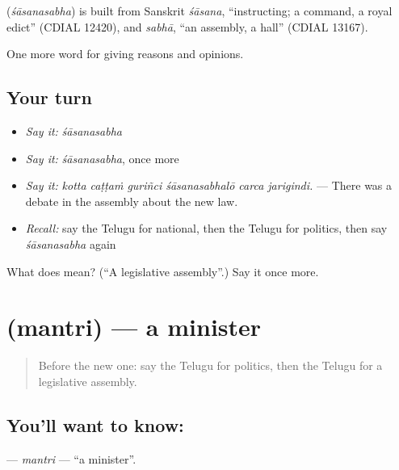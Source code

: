 \begin{cousinweb}
\textbf{} (\emph{śāsanasabha}) is built from Sanskrit \emph{śāsana}, \textquotedblleft{}instructing; a command, a royal edict\textquotedblright{} (CDIAL 12420), and \emph{sabhā}, \textquotedblleft{}an assembly, a hall\textquotedblright{} (CDIAL 13167).
\end{cousinweb}

\begin{grammarlens}[title={What you've built}]
One more word for giving reasons and opinions.
\end{grammarlens}

\subsection*{Your turn}
\begin{itemize}
\raggedright
  \item \emph{Say it:} \emph{śāsanasabha}
  \item \emph{Say it:} \emph{śāsanasabha}, once more
  \item \emph{Say it:} \emph{kotta caṭṭaṁ guriñci śāsanasabhalō carca jarigindi.} — There was a debate in the assembly about the new law.
  \item \emph{Recall:} say the Telugu for national, then the Telugu for politics, then say \emph{śāsanasabha} again
\end{itemize}

\begin{tcolorbox}[breakable,colback=teal!4,colframe=teal!35!black,title={Before you move on}]
What does  mean? (\textquotedblleft{}A legislative assembly\textquotedblright{}.) Say it once more.
\end{tcolorbox}
\section[\texorpdfstring{\te{మంత్రి} (mantri)}{మంత్రి (mantri)}]{ (mantri) — a minister}

\label{lesson:TE-C402-mantri}



\begin{quote}
Before the new one: say the Telugu for politics, then the Telugu for a legislative assembly.
\end{quote}

\subsection*{You'll want to know: }
\textbf{} — \emph{mantri} — \textquotedblleft{}a minister\textquotedblright{}.

